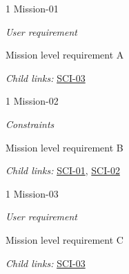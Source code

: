 \begin{frame}{1 Mission-01}
\protect\hypertarget{Mission-01}{}

\emph{User requirement}

Mission level requirement A

\emph{Child links:} \href{L2.html\#SCI-03}{SCI-03}

\end{frame}

\begin{frame}{1 Mission-02}
\protect\hypertarget{Mission-02}{}

\emph{Constraints}

Mission level requirement B

\emph{Child links:} \href{L2.html\#SCI-01}{SCI-01},
\href{L2.html\#SCI-02}{SCI-02}

\end{frame}

\begin{frame}{1 Mission-03}
\protect\hypertarget{Mission-03}{}

\emph{User requirement}

Mission level requirement C

\emph{Child links:} \href{L2.html\#SCI-03}{SCI-03}

\end{frame}
